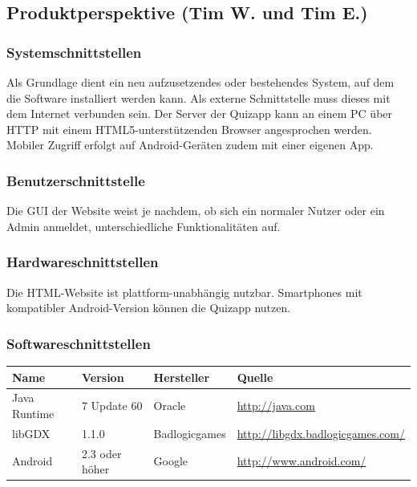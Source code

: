 \documentclass[fontsize=12pt,paper=a4,twoside]{scrartcl}
\begin{document}
\subsection{Produktperspektive (Tim W. und Tim E.)}
  
\subsubsection{Systemschnittstellen}
  
Als Grundlage dient ein neu aufzusetzendes oder bestehendes System, auf dem die Software installiert werden kann. Als externe Schnittstelle muss dieses mit dem Internet verbunden sein. Der Server der Quizapp kann an einem PC über HTTP mit einem HTML5-unterstützenden Browser angesprochen werden. Mobiler Zugriff erfolgt auf Android-Geräten zudem mit einer eigenen App.

\subsubsection{Benutzerschnittstelle}

Die GUI der Website weist je nachdem, ob sich ein normaler Nutzer oder ein Admin anmeldet, unterschiedliche Funktionalitäten auf. 

\subsubsection{Hardwareschnittstellen}

Die HTML-Website ist plattform-unabhängig nutzbar. Smartphones mit kompatibler Android-Version können die Quizapp nutzen.


\subsubsection{Softwareschnittstellen}

 \begin{tabular}{|p{3cm}|p{3cm}|p{4cm}|p{5cm}|}\hline
    \textbf{Name} & \textbf{Version} & \textbf{Hersteller} & \textbf{Quelle} \\\hline
    Java Runtime & 7 Update 60 & Oracle & \url{http://java.com} \\\hline
    libGDX & 1.1.0  & Badlogicgames  & \url{http://libgdx.badlogicgames.com/} \\\hline
    Android & 2.3 oder höher & Google & \url{http://www.android.com/} \\\hline 
  \end{tabular}
\end{document}
